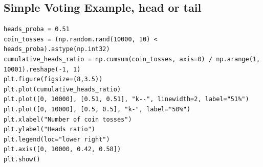 \documentclass[%
oneside,                 %
final,                   %
10pt]{article}
\begin{document}
\subsection*{Simple Voting Example, head or tail}
\begin{verbatim}
heads_proba = 0.51
coin_tosses = (np.random.rand(10000, 10) < heads_proba).astype(np.int32)
cumulative_heads_ratio = np.cumsum(coin_tosses, axis=0) / np.arange(1, 10001).reshape(-1, 1)
plt.figure(figsize=(8,3.5))
plt.plot(cumulative_heads_ratio)
plt.plot([0, 10000], [0.51, 0.51], "k--", linewidth=2, label="51%")
plt.plot([0, 10000], [0.5, 0.5], "k-", label="50%")
plt.xlabel("Number of coin tosses")
plt.ylabel("Heads ratio")
plt.legend(loc="lower right")
plt.axis([0, 10000, 0.42, 0.58])
plt.show()

\end{verbatim}

\end{document}

